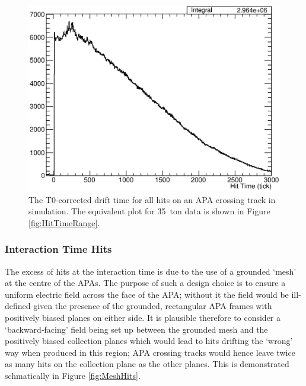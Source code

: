 \begin{figure}
  \centering
  \includegraphics[width=12cm]{HitTimesMC.eps}
  \caption[The T0-corrected drift time for all hits on an APA crossing track in simulation.]{The T0-corrected drift time for all hits on an APA crossing track in simulation.  The equivalent plot for 35~ton data is shown in Figure \ref{fig:HitTimeRange}.}
  \label{fig:HitTimesMC}
\end{figure}

\subsubsection{Interaction Time Hits}\label{sec:InteractionTimeHits}

The excess of hits at the interaction time is due to the use of a grounded `mesh' at the centre of the APAs.  The purpose of such a design choice is to ensure a uniform electric field across the face of the APA; without it the field would be ill-defined given the presence of the grounded, rectangular APA frames with positively biased planes on either side.  It is plausible therefore to consider a `backward-facing' field being set up between the grounded mesh and the positively biased collection planes which would lead to hits drifting the `wrong' way when produced in this region; APA crossing tracks would hence leave twice as many hits on the collection plane as the other planes.  This is demonstrated schmatically in Figure \ref{fig:MeshHits}.

